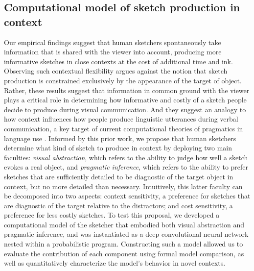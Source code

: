 \documentclass[9pt,twocolumn,twoside]{pnas-new}
\begin{document}





\subsection*{Computational model of sketch production in context}

Our empirical findings suggest that human sketchers spontaneously take information that is shared with the viewer into account, producing more informative sketches in close contexts at the cost of additional time and ink. 
Observing such contextual flexibility argues against the notion that sketch production is constrained exclusively by the appearance of the target of object. 
Rather, these results suggest that information in common ground with the viewer plays a critical role in determining how informative and costly of a sketch people decide to produce during visual communication. 
And they suggest an analogy to how context influences how people produce linguistic utterances during verbal communication, a key target of current computational theories of pragmatics in language use \cite{frank2012predicting,goodman2013knowledge,franke2016probabilistic,bergen2016pragmatic}.
Informed by this prior work, we propose that human sketchers determine what kind of sketch to produce in context by deploying two main faculties: \textit{visual abstraction}, which refers to the ability to judge how well a sketch evokes a real object, and \textit{pragmatic inference}, which refers to the ability to prefer sketches that are sufficiently detailed to be diagnostic of the target object in context, but no more detailed than necessary. 
Intuitively, this latter faculty can be decomposed into two aspects: context sensitivity, a preference for sketches that are diagnostic of the target relative to the distractors; and cost sensitivity, a preference for less costly sketches. 
To test this proposal, we developed a computational model of the sketcher that embodied both visual abstraction and pragmatic inference, and was instantiated as a deep convolutional neural network nested within a probabilistic program. 
Constructing such a model allowed us to evaluate the contribution of each component using formal model comparison, as well as quantitatively characterize the model's behavior in novel contexts.
\end{document}
